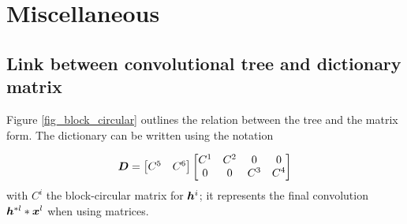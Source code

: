 \clearpage
{}
\appendix

\chapter{Miscellaneous}


\section{Link between convolutional tree and dictionary matrix}\label{sec_matrix_vs_tree} %

Figure \ref{fig_block_circular} outlines the relation between the tree and the matrix form. The dictionary can be written using the notation

$$\bm{D} = \begin{bmatrix}C^5 & C^6\end{bmatrix} \begin{bmatrix}C^1 & C^2 & 0 & 0 \\0 & 0 & C^3 & C^4\end{bmatrix}$$
with $C^i$ the block-circular matrix for $\bm{h}^i$; it represents the final convolution $\bm{h}^{*l}*\bm{x}^l$ when using matrices.


